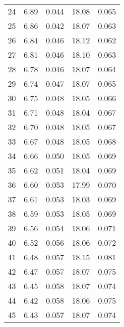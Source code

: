 \begin{table}
\begin{tabular}{c|ll|ll}
24 & 6.89 & 0.044 & 18.08 & 0.065 \\
25 & 6.86 & 0.042 & 18.07 & 0.063 \\
26 & 6.84 & 0.046 & 18.12 & 0.062 \\
27 & 6.81 & 0.046 & 18.10 & 0.063 \\
28 & 6.78 & 0.046 & 18.07 & 0.064 \\
29 & 6.74 & 0.047 & 18.07 & 0.065 \\
30 & 6.75 & 0.048 & 18.05 & 0.066 \\
31 & 6.71 & 0.048 & 18.04 & 0.067 \\
32 & 6.70 & 0.048 & 18.05 & 0.067 \\
33 & 6.67 & 0.048 & 18.05 & 0.068 \\
34 & 6.66 & 0.050 & 18.05 & 0.069 \\
35 & 6.62 & 0.051 & 18.04 & 0.069 \\
36 & 6.60 & 0.053 & 17.99 & 0.070 \\
37 & 6.61 & 0.053 & 18.03 & 0.069 \\
38 & 6.59 & 0.053 & 18.05 & 0.069 \\
39 & 6.56 & 0.054 & 18.06 & 0.071 \\
40 & 6.52 & 0.056 & 18.06 & 0.072 \\
41 & 6.48 & 0.057 & 18.15 & 0.081 \\
42 & 6.47 & 0.057 & 18.07 & 0.075 \\
43 & 6.45 & 0.058 & 18.07 & 0.074 \\
44 & 6.42 & 0.058 & 18.06 & 0.075 \\
45 & 6.43 & 0.057 & 18.07 & 0.074 \\
               \hline
        \end{tabular}
    \end{table}
    \clearpage

